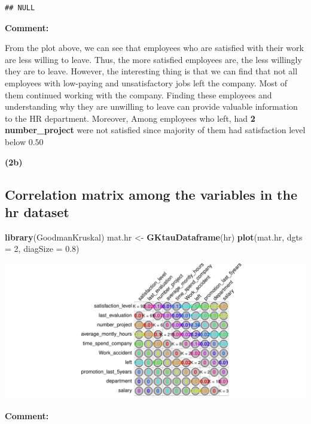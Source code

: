 \documentclass[
  11pt,
]{article}
\newenvironment{Shaded}{\begin{snugshade}}{\end{snugshade}}
\newcommand{\AttributeTok}[1]{\textcolor[rgb]{0.13,0.29,0.53}{#1}}
\newcommand{\DecValTok}[1]{\textcolor[rgb]{0.00,0.00,0.81}{#1}}
\newcommand{\FloatTok}[1]{\textcolor[rgb]{0.00,0.00,0.81}{#1}}
\newcommand{\FunctionTok}[1]{\textcolor[rgb]{0.13,0.29,0.53}{\textbf{#1}}}
\newcommand{\NormalTok}[1]{#1}
\newcommand{\OtherTok}[1]{\textcolor[rgb]{0.56,0.35,0.01}{#1}}
\begin{document}
\begin{verbatim}
## NULL
\end{verbatim}

\hfill\break

\textbf{Comment:}

From the plot above, we can see that employees who are satisfied with
their work are less willing to leave. Thus, the more satisfied employees
are, the less willingly they are to leave. However, the interesting
thing is that we can find that not all employees with low-paying and
unsatisfactory jobs left the company. Most of them continued working
with the company. Finding these employees and understanding why they are
unwilling to leave can provide valuable information to the HR
department. Moreover, Among employees who left, had \textbf{2
number\_project} were not satisfied since majority of them had
satisfaction level below \(0.50\)

\hfill\break
\textbf{(2b)}

\subsection{Correlation matrix among the variables in the \textbf{hr} dataset}

\begin{Shaded}
\begin{Highlighting}[]
\FunctionTok{library}\NormalTok{(GoodmanKruskal)}
\NormalTok{mat.hr }\OtherTok{\textless{}{-}} \FunctionTok{GKtauDataframe}\NormalTok{(hr)}
\FunctionTok{plot}\NormalTok{(mat.hr, }\AttributeTok{dgts =} \DecValTok{2}\NormalTok{, }\AttributeTok{diagSize =} \FloatTok{0.8}\NormalTok{)}
\end{Highlighting}
\end{Shaded}

\includegraphics[width=0.9\linewidth]{OWUSU_project_files/figure-latex/unnamed-chunk-9-1}

\hfill\break
\textbf{Comment:}
\end{document}
